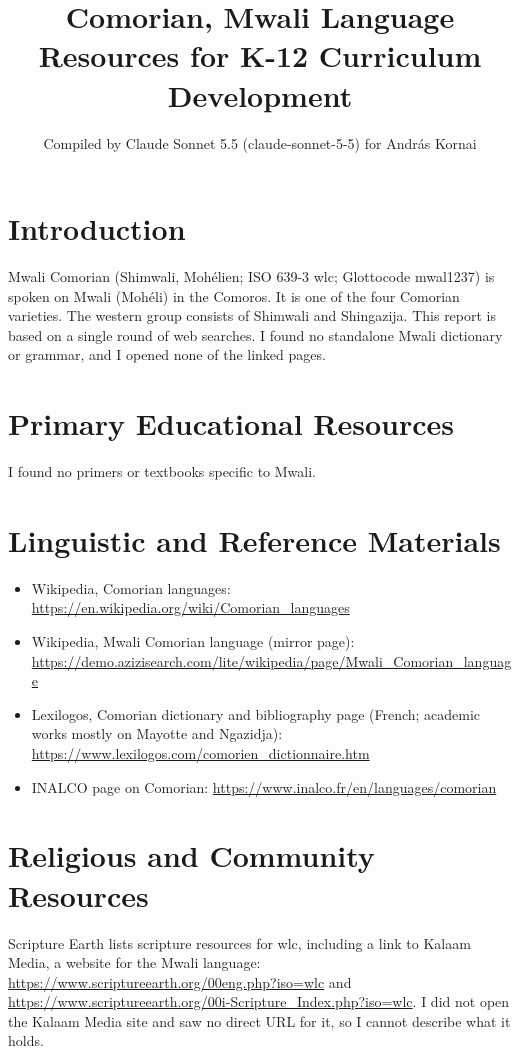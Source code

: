 \documentclass[12pt]{article}
\title{Comorian, Mwali Language Resources for K-12 Curriculum Development}
\author{Compiled by Claude Sonnet 5.5 (claude-sonnet-5-5) for Andr\'as Kornai}
\date{}
\begin{document}
\maketitle

\section{Introduction}
Mwali Comorian (Shimwali, Mohélien; ISO 639-3 wlc; Glottocode mwal1237) is spoken on Mwali (Mohéli) in the Comoros. It is one of the four Comorian varieties. The western group consists of Shimwali and Shingazija. This report is based on a single round of web searches. I found no standalone Mwali dictionary or grammar, and I opened none of the linked pages.

\section{Primary Educational Resources}
I found no primers or textbooks specific to Mwali.

\section{Linguistic and Reference Materials}
\begin{itemize}
\item Wikipedia, Comorian languages: \url{https://en.wikipedia.org/wiki/Comorian_languages}
\item Wikipedia, Mwali Comorian language (mirror page): \url{https://demo.azizisearch.com/lite/wikipedia/page/Mwali_Comorian_language}
\item Lexilogos, Comorian dictionary and bibliography page (French; academic works mostly on Mayotte and Ngazidja): \url{https://www.lexilogos.com/comorien_dictionnaire.htm}
\item INALCO page on Comorian: \url{https://www.inalco.fr/en/languages/comorian}
\end{itemize}

\section{Religious and Community Resources}
Scripture Earth lists scripture resources for wlc, including a link to Kalaam Media, a website for the Mwali language: \url{https://www.scriptureearth.org/00eng.php?iso=wlc} and \url{https://www.scriptureearth.org/00i-Scripture_Index.php?iso=wlc}. I did not open the Kalaam Media site and saw no direct URL for it, so I cannot describe what it holds.
\end{document}

